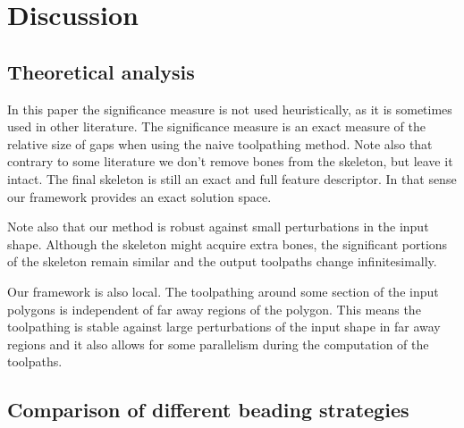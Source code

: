 \section{Discussion}

\subsection{Theoretical analysis}
In this paper the significance measure is not used heuristically, as it is sometimes used in other literature.
The significance measure is an exact measure of the relative size of gaps when using the naive toolpathing method.
Note also that contrary to some literature we don't remove bones from the skeleton, but leave it intact.
The final skeleton is still an exact and full feature descriptor.
In that sense our framework provides an exact solution space.

Note also that our method is robust against small perturbations in the input shape.
Although the skeleton might acquire extra bones, the significant portions of the skeleton remain similar and the output toolpaths change infinitesimally.

Our framework is also local.
The toolpathing around some section of the input polygons is independent of far away regions of the polygon.
This means the toolpathing is stable against large perturbations of the input shape in far away regions
and it also allows for some parallelism during the computation of the toolpaths.


\subsection{Comparison of different beading strategies}
